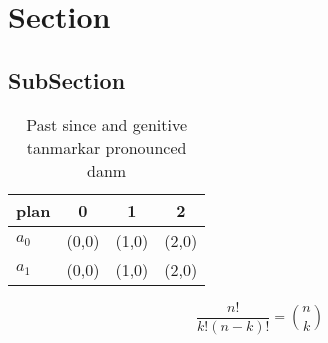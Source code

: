 \documentclass[a4paper]{article}
\begin{document}
\section{Section}

\subsection{SubSection}

\begin{table}
\begin{adjustbox}{width=0.6\columnwidth}
\begin{tabular}{|l|l|l|l|}
\hline
\textbf{plan} & \multicolumn{1}{c|}{\textbf{0}} & \multicolumn{1}{c|}{\textbf{1}} & \multicolumn{1}{c|}{\textbf{2}} \\ \hline
\textbf{$a_0$}  & (0,0) & (1,0) & (2,0) \\ \hline
\textbf{$a_1$}  & (0,0) & (1,0) & (2,0) \\ \hline
\end{tabular}
\end{adjustbox}
\caption{Past since and genitive tanmarkar pronounced danm
}
\end{table}

\[ \frac{n!}{k!(n-k)!} = \binom{n}{k} \]
\end{document}
